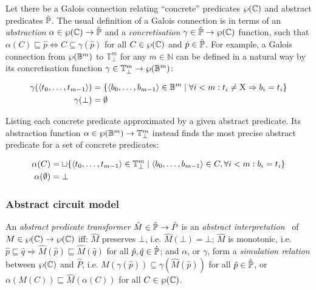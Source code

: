 Let there be a Galois connection relating ``concrete'' predicates $\wp(\mathbb{C})$ and abstract predicates $\hat{\mathbb{P}}$. The usual definition of a Galois connection is in terms of an \textit{abstraction} $\alpha \in \wp(\mathbb{C}) \rightarrow \hat{\mathbb{P}}$ and a \textit{concretisation} $\gamma \in \hat{\mathbb{P}} \rightarrow \wp(\mathbb{C})$ function, such that $\alpha(C) \sqsubseteq \hat p \iff C \subseteq \gamma(\hat p)$ for all $C \in \wp(\mathbb{C})$ and $\hat p \in \hat{\mathbb{P}}$. For example, a Galois connection from $\wp(\mathbb{B}^{m})$ to $\mathbb{T}_{\bot}^{m}$ for any $m \in \mathbb{N}$ can be defined in a natural way by its concretisation function $\gamma \in \mathbb{T}_{\bot}^{m} \rightarrow \wp(\mathbb{B}^{m})$:

\begin{align*}
\gamma ( \langle t_{0}, \dots,t_{m-1} \rangle ) &= \{ \langle b_{0}, \dots,b_{m-1} \rangle \in \mathbb{B}^{m} \mid \forall i < m : t_{i} \neq \mathrm{X} \Rightarrow b_{i} = t_{i} \} \\
\gamma ( \bot ) &= \emptyset
\end{align*}

\noindent Listing each concrete predicate approximated by a given abstract predicate. Its abstraction function $\alpha \in \wp(\mathbb{B}^{m}) \rightarrow \mathbb{T}_{\bot}^{m}$ instead finds the most precise abstract predicate for a set of concrete predicates:

\begin{align*}
\alpha ( C ) &= \operatorname{\sqcup} \{ \langle t_{0}, \ldots, t_{m-1} \rangle \in \mathbb{T}_{\bot}^{m} \mid \langle b_{0}, \ldots, b_{m-1} \rangle \in C, \forall i < m : b_{i} = t_{i} \} \\
\alpha ( \emptyset ) &= \bot
\end{align*}

\subsubsection{Abstract circuit model} \label{sec:lat-ste-model}

An \textit{abstract predicate transformer} $\hat M \in \hat{\mathbb{P}} \rightarrow \hat P$ is an \textit{abstract interpretation}~\cite{cousot1996} of $M \in \wp(\mathbb{C}) \rightarrow \wp(\mathbb{C})$ iff: $\hat M$ preserves $\bot$, i.e. $\hat M(\bot) = \bot$; $\hat M$ is monotonic, i.e. $\hat p \sqsubseteq \hat q \Rightarrow \hat M (\hat p) \sqsubseteq \hat M (\hat q)$ for all $\hat p, \hat q \in \hat{\mathbb{P}}$; and $\alpha$, or $\gamma$, form a \textit{simulation relation} between $\wp(\mathbb{C})$ and $\hat P$, i.e. $M(\gamma(\hat p)) \subseteq \gamma(\hat M(\hat p))$ for all $\hat p \in \hat{\mathbb{P}}$, or $\alpha(M(C)) \sqsubseteq \hat M(\alpha(C))$ for all $C \in \wp(\mathbb{C})$.

